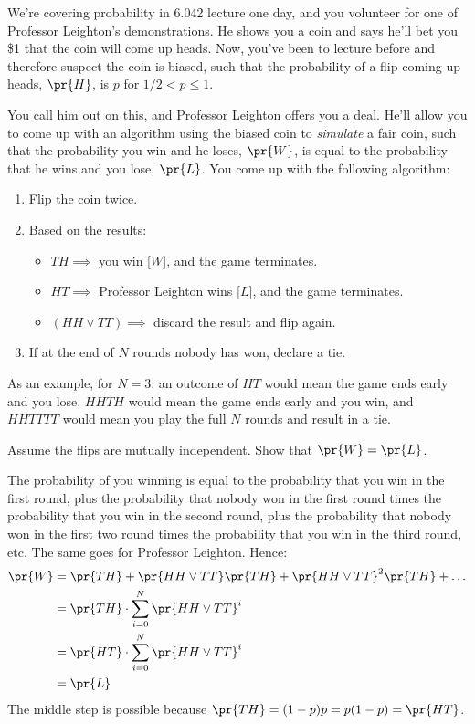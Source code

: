 \documentclass[handout]{mcs}
\begin{document}
\instatements{\vspace{0.5in}}
\begin{problem}
We're covering probability in 6.042 lecture one day, and you volunteer
for one of Professor Leighton's demonstrations. He shows you a coin
and says he'll bet you \$1 that the coin will come up heads. Now,
you've been to lecture before and therefore suspect the coin is
biased, such that the probability of a flip coming up heads, $\pr{H}$,
is $p$ for $1/2 < p \leq 1$.

You call him out on this, and Professor Leighton offers you a
deal. He'll allow you to come up with an algorithm using the biased
coin to \textit{simulate} a fair coin, such that the probability you
win and he loses, $\pr{W}$, is equal to the probability that he wins
and you lose, $\pr{L}$. You come up with the following algorithm:

\begin{enumerate}
\item Flip the coin twice.
\item Based on the results:
        \begin{itemize}
        \item $TH \implies$ you win [$W$], and the game terminates.
        \item $HT \implies$ Professor Leighton wins [$L$], and the game terminates.
        \item $(HH \lor TT) \implies$ discard the result and flip again.
        \end{itemize}
\item If at the end of $N$ rounds nobody has won, declare a tie.
\end{enumerate}
As an example, for $N=3$, an outcome of $HT$ would mean the game ends
early and you lose, $HHTH$ would mean the game ends early and you win,
and $HHTTTT$ would mean you play the full $N$ rounds and result in a
tie.

\bparts

\ppart
Assume the flips are mutually independent. Show that $\pr{W} = \pr{L}$.

\begin{solution}
The probability of you winning is equal to the probability that you
win in the first round, plus the probability that nobody won in the
first round times the probability that you win in the second round,
plus the probability that nobody won in the first two round times the
probability that you win in the third round, etc. The same goes for
Professor Leighton. Hence:
\begin{align*}
\pr{W} &= \pr{TH} + \pr{HH \lor TT}\pr{TH} + \pr{HH \lor TT}^2\pr{TH} + \ldots \\
& = \pr{TH} \cdot \sum_{i=0}^N \pr{HH \lor TT}^i \\
& = \pr{HT} \cdot \sum_{i=0}^N \pr{HH \lor TT}^i\\
& = \pr{L}
\end{align*}
The middle step is possible because $\pr{TH} = (1-p)p = p(1-p) = \pr{HT}$.


\end{solution}
\end{problem}
\end{document}
